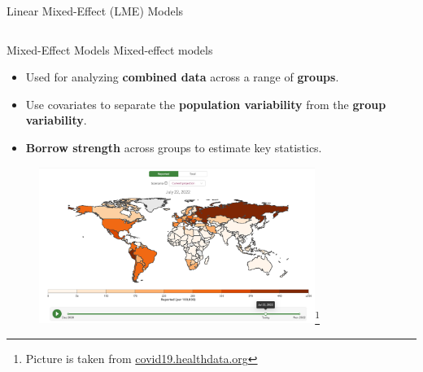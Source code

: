 \documentclass[8pt]{beamer}
\begin{document}
\begin{frame}{Linear Mixed-Effect (LME) Models}
\begin{columns}[T,onlytextwidth]
   	
  \end{columns}
\end{frame}

\begin{frame}{Mixed-Effect Models}
Mixed-effect models
\begin{itemize}
	\item Used for analyzing \textbf{combined data} across a range of \textbf{groups}.
	\item Use covariates to separate the \textbf{population variability} from the \textbf{group variability}.
	\item \textbf{Borrow strength} across groups to estimate key statistics. %
\end{itemize}

\begin{figure}
	\centering
	\includegraphics[width=0.8\textwidth]{Figures/ihme_predictions.png}\footnote{Picture is taken from \href{covid19.healthdata.org}{covid19.healthdata.org} }
\end{figure}

\end{frame}

%   	
\end{document}

